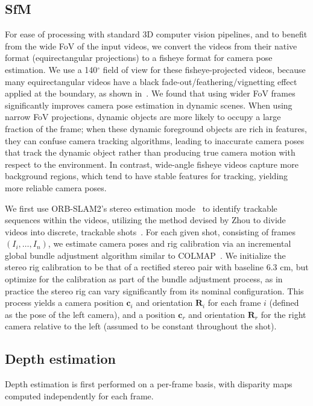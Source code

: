 \subsection{SfM}
For ease of processing with standard 3D computer vision pipelines, and to benefit from the wide FoV of the input videos, we convert the videos from their native format (equirectangular projections) to a fisheye format for camera pose estimation. 
We use a 140$^\circ$ field of view for these fisheye-projected videos, because many equirectangular videos have a black fade-out/feathering/vignetting effect applied at the boundary, as shown in~.
We found that using wider FoV frames significantly improves camera pose estimation in dynamic scenes. 
When using narrow FoV projections, dynamic objects are more likely to occupy a large fraction of the frame; when these dynamic foreground objects are rich in features, they can confuse camera tracking algorithms, leading to inaccurate camera poses that track the dynamic object rather than producing true camera motion with respect to the environment. 
In contrast, wide-angle fisheye videos capture more background regions, which tend to have stable features for tracking, yielding more reliable camera poses.

We first use ORB-SLAM2's stereo estimation mode~\cite{murartal2015orbslam}
to identify trackable sequences within the videos, utilizing the method devised by Zhou \etal to divide videos into discrete, trackable shots~\cite{zhou2018stereo}. 
For each given shot, consisting of frames $(I_i, \ldots, I_n)$, we estimate camera poses and rig calibration via an incremental global bundle adjustment algorithm similar to COLMAP~\cite{schonberger2016structure}. 
We initialize the stereo rig calibration to be that of a rectified stereo pair with baseline 6.3 cm, but optimize for the calibration as part of the bundle adjustment process, as in practice the stereo rig can vary significantly from its nominal configuration.
This process yields a camera position $\mathbf{c}_i$ and orientation $\mathbf{R}_i$ for each frame $i$ (defined as the pose of the left camera), and a position $\mathbf{c}_r$ and orientation $\mathbf{R}_r$ for the right camera relative to the left (assumed to be constant throughout the shot).


\subsection{Depth estimation}
Depth estimation is first performed on a per-frame basis, with disparity maps computed independently for each frame.  

